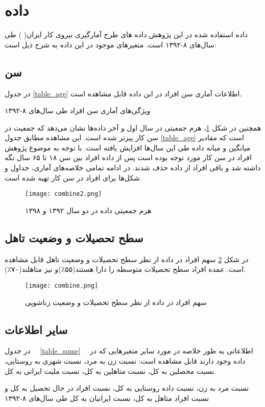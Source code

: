 \documentclass[12pt, a4paper]{article}
\begin{document}
\section{داده}
داده‌ استفاده شده در این پژوهش داده های طرح آمارگیری نیروی کار ایران(
) طی سال‌های ۸-۱۳۹۲  است. متغیرهای موجود در این داده به شرح ذیل است:
\subsection{سن}
در جدول 
\ref{table_age}
اطلاعات آماری سن افراد در این داده قابل مشاهده است.
\begin{table}
	\centering
	\caption{ویژگی‌های آماری سن افراد طی سال‌های ۸-۱۳۹۲}\label{table_age}
	\begin{latin}
		\begin{LTR}
			
		\end{LTR}
	\end{latin}

\end{table}
همچنین در شکل
\ref{fig_pp}،
هرم جمعیتی در سال اول و آخر داده‌ها نشان می‌دهد که جمعیت در سن کار پیرتر شده است. این مشاهده مطابق جدول
\ref{table_age}
است که مقادیر میانگین و میانه داده طی این سال‌ها افزایش یافته است.
با توجه به موضوع پژوهش افراد در سن کار مورد توجه بوده است پس از داده افراد بین سن ۱۸ تا ۶۵ سال نگه داشته شد و باقی افراد از داده حذف شدند.  در ادامه تمامی خلاصه‌های آماری، جداول و شکل‌ها برای افراد در سن کار تهیه شده است. 
\begin{figure}
	\centering
	\texttt{[image: combine2.png]}
	\caption{هرم جمعیتی داده در دو سال ۱۳۹۲ و ۱۳۹۸}\label{fig_pp}
\end{figure}
\subsection{سطح تحصیلات و وضعیت تاهل}
در شکل
\ref{fig_com}
سهم افراد در داده از نظر سطح تحصیلات و وضعیت تاهل قابل مشاهده است. عمده افراد سطح تحصیلات متوسطه را دارا هستند(۵۵٪)و نیز متاهلند(۷۰٪).
\begin{figure}
	\centering
	\texttt{[image: combine.png]}
	\caption{سهم افراد در داده از نظر سطح تحصیلات و وضعیت زناشویی}\label{fig_com}
\end{figure}

\subsection{سایر اطلاعات}
در جدول
  \ref*{table_some}
  اطلاعاتی  به طور خلاصه در مورد سایر متغیرهایی که در داده وجود دارند قابل مشاهده است: نسبت زن به مرد، نسبت شهری به روستایی، نسبت محصلین به کل، نسبت متاهلین به کل، نسبت ملیت ایرانی به کل.
\begin{table}
	\centering
	\caption{نسبت مرد به زن، نسبت داده روستایی به کل، نسبت افراد در حال تحصیل به کل و نسبت افراد متاهل به کل، نسبت ایرانیان به کل طی سال‌های ۸-۱۳۹۲}\label{table_some}
	\begin{latin}
		\begin{LTR}
			
		\end{LTR}
	\end{latin}
\end{table}
\end{document}
